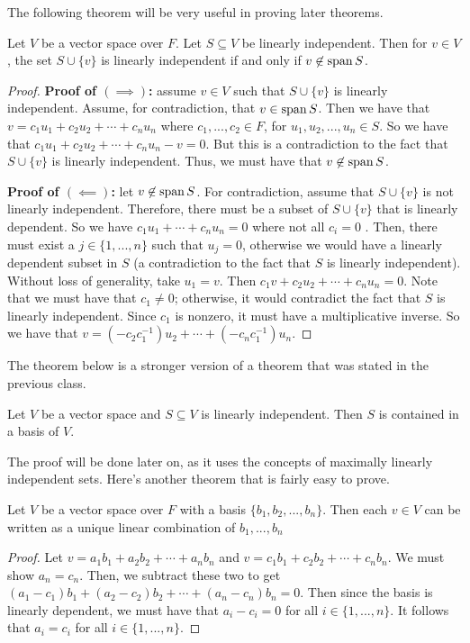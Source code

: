 \documentclass[main.tex]{subfiles}
\begin{document}
    The following theorem will be very useful in proving later theorems. 
    \begin{thrm}{}{}
        Let $V$ be a vector space over $F$. Let $S\subseteq V$ be linearly independent. Then for $v\in V$, the set $S \cup \{v\}$ is linearly independent if and only if $v\not\in \operatorname{span} S$.
    \end{thrm}
    \begin{proof}
        \textbf{Proof of $(\implies)$:} assume $v\in V$ such that $S\cup \{v\}$ is linearly independent. Assume, for contradiction, that $v\in \operatorname{span} S$. Then we have that $v = c_1u_1 + c_2u_2 + \cdots + c_nu_n$ where $c_1, ..., c_2\in F$, for $u_1, u_2, ..., u_n\in S$. So we have that $c_1u_1 + c_2u_2 + \cdots + c_nu_n - v = 0$. But this is a contradiction to the fact that $S\cup \{v\}$ is linearly independent. Thus, we must have that $v\not\in \operatorname{span} S$. \bigbreak 

        \textbf{Proof of $(\impliedby)$:} let $v\not\in \operatorname{span} S$. For contradiction, assume that $S\cup \{v\}$ is not linearly independent. Therefore, there must be a subset of $S\cup \{v\}$ that is linearly dependent. So we have $c_1u_1 + \cdots + c_nu_n = 0$ where not all $c_i = 0$ . Then, there must exist a $j\in \{1, ..., n\}$ such that $u_j = 0$, otherwise we would have a linearly dependent subset in $S$ (a contradiction to the fact that $S$ is linearly independent). Without loss of generality, take $u_1 = v$. Then $c_1v + c_2u_2 + \cdots + c_nu_n = 0$. Note that we must have that $c_1 \neq 0$; otherwise, it would contradict the fact that $S$ is linearly independent. Since $c_1$ is nonzero, it must have a multiplicative inverse. So we have that $v = (-c_2c_1^{-1})u_2 + \cdots + (-c_nc_1^{-1})u_n$.
    \end{proof}

    The theorem below is a stronger version of a theorem that was stated in the previous class. 
    \begin{thrm}{}{}
        Let $V$ be a vector space and $S\subseteq V$ is linearly independent. Then $S$ is contained in a basis of $V$.
    \end{thrm}
    The proof will be done later on, as it uses the concepts of maximally linearly independent sets. Here's another theorem that is fairly easy to prove. 
    \begin{thrm}{}{}
        Let $V$ be a vector space over $F$ with a basis $\{b_1, b_2, ..., b_n\}$. Then each $v\in V$ can be written as a unique linear combination of $b_1, ..., b_n$
    \end{thrm}
    \begin{proof}
        Let $v = a_1b_1 + a_2b_2 + \cdots + a_nb_n$ and $v = c_1b_1 + c_2b_2 + \cdots + c_nb_n$. We must show $a_n = c_n$. Then, we subtract these two to get $(a_1 - c_1)b_1 + (a_2 - c_2)b_2 + \cdots + (a_n - c_n)b_n = 0$. Then since the basis is linearly dependent, we must have that $a_i - c_i = 0$ for all $i\in \{1, ..., n\}$. It follows that $a_i = c_i$ for all $i\in \{1, ..., n\}$. 
    \end{proof}
\end{document}
